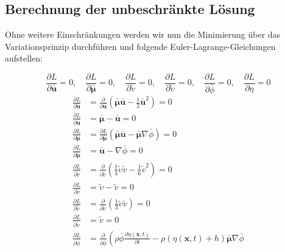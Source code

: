 \subsection{Berechnung der unbeschränkte Lösung}

Ohne weitere Einschränkungen werden wir nun die Minimierung über das Variationsprinzip durchführen und folgende Euler-Lagrange-Gleichungen aufstellen:

\[
\frac{\partial L}{\partial \bar{\bm{u}}} = 0
,\quad
\frac{\partial L}{\partial \bar{\bm{\mu}}} = 0
,\quad
\frac{\partial L}{\partial \tilde{v}} = 0
,\quad
\frac{\partial L}{\partial \tilde{\upsilon}} = 0
,\quad
\frac{\partial L}{\partial \bar{\phi}} = 0
,\quad
\frac{\partial L}{\partial \eta} = 0
\]
\begin{align}
	\frac{\partial L}{\partial \bar{\bm{u}}}
	&=
	\frac{\partial \mathscr{}}{\partial \bar{\bm{u}}}\left(\bar{\bm{\mu}}\bar{\bm{u}} - \frac{1}{2} \bar{\bm{u}}^2\right)
	= 0
	\nonumber \\ 
	\frac{\partial L}{\partial \bar{\bm{u}}}
	&=
	\bar{\bm{\mu}} - \bar{\bm{u}}
	= 0
	\label{luke:Variation_nach_u} 
	\\
	\frac{\partial L}{\partial \bar{\bm{\mu}}}
	&=
	\frac{\partial L}{\partial \bar{\bm{\mu}}} \left( \bar{\bm{\mu}}\bar{\bm{u}}-\bar{\bm{\mu}}\nabla \bar{\phi} \right)
	= 0
	\nonumber \\
	\frac{\partial L}{\partial \bar{\bm{\mu}}}
	&=
	\bar{\bm{u}}-\nabla \bar{\phi}
	= 0
	\label{luke:Variation_nach_mu}
	\\
	\frac{\partial L}{\partial \tilde{v}}
	&=
	\frac{\partial \mathscr{}}{\partial \tilde{v}}\left(\frac{1}{3} \tilde{\upsilon}\tilde{v} - \frac{1}{6} \tilde{v}^2\right)
	= 0
	\nonumber \\
	\frac{\partial L}{\partial \tilde{v}}
	&=
	\tilde{\upsilon}-\tilde{v}
	= 0
	\label{luke:Variation_nach_v}
	\\
	\frac{\partial L}{\partial \tilde{\upsilon}}
	&=
	\frac{\partial \mathscr{}}{\partial \tilde{\upsilon}}\left(\frac{1}{3} \tilde{\upsilon}\tilde{v}\right)
	= 0
	\nonumber \\	
	\frac{\partial L}{\partial \tilde{\upsilon}}
	&=
	\tilde{v}
	= 0
	\label{luke:Variation_nach_upsilon}
	\\
	\frac{\partial L}{\partial \bar{\phi}}
	&=
	\frac{\partial \mathscr{}}{\partial \bar{\phi}}\left(
	\rho\bar{\phi}\frac{\partial \eta(\bm{x}, t)}{\partial t}
	-
	\rho(\eta(\bm{x}, t) + h)\bar{\bm{\mu}}\nabla \bar{\phi}

\end{align}
